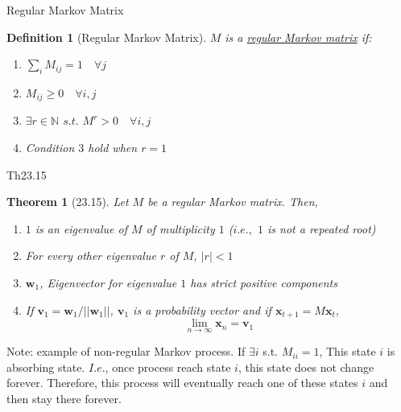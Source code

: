 \documentclass[a4paper,11pt]{article}
\newtheorem{defn}{Definition}
\newtheorem{thm}{Theorem}
\newcommand{\bb}{\mathbb}
\newcommand{\bd}{\mathbf}
\begin{document}
\begin{frame}[t]{Regular Markov Matrix}
	\begin{defn}
		[Regular Markov Matrix] $M$ is a \uline{regular Markov matrix} if:
		\begin{enumerate}
			\item $\sum_{i} M_{ij} = 1 \quad \forall j$
			\item $M_{ij}\ge 0\quad \forall i,j$
			\item $\exists r\in\bb{N}$ $s.t.$ $M^r>0\quad\forall i,j$
			\item Condition $3$ hold when $r=1$
		\end{enumerate}
	\end{defn}

\end{frame}

\begin{frame}[t]{Th23.15}
	\begin{thm}
		[23.15] Let $M$ be a regular Markov matrix. Then,
		\begin{enumerate}
			\item $1$ is an eigenvalue of $M$ of multiplicity $1$ ($i.e.,$ $1$ is not a repeated root)
			\item For every other eigenvalue $r$ of $M$, $|r|<1$
			\item $\bd{w}_1$, Eigenvector for eigenvalue $1$ has strict positive components
			\item If $\bd{v}_1 = \bd{w}_1/||\bd{w}_1||$, $\bd{v}_1$ is a probability vector and if $\bd{x}_{t+1}=M\bd{x}_t$, \[
				\lim_{n\rightarrow\infty}\bd{x}_n = \bd{v}_1
			\]
		\end{enumerate}
	\end{thm}
	Note: example of non-regular Markov process. If $\exists i$ s.t. $M_{ii}=1$, This state $i$ is absorbing state. $I.e.$, once process reach state $i$, this state does not change forever. Therefore, this process will eventually reach one of these states $i$ and then stay there forever.
\end{frame}
\end{document}
